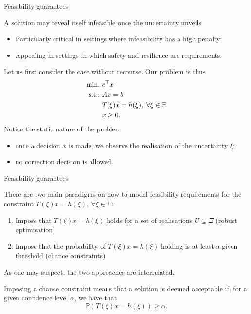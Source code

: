 \begin{frame}{Feasibility guarantees}

	A solution may \alert{reveal itself infeasible} once the uncertainty unveils
	\vspace{-6pt}
	\begin{itemize}
		\item Particularly critical in settings where \alert{infeasibility} has a high penalty;
		\item Appealing in settings in which \alert{safety and resilience} are requirements.	
	\end{itemize}
	
	\pause
	Let us first consider the case \alert{without} recourse. Our problem is thus
	\begin{align*}
		\mathop{\text{min.} \ } & c^\top x  \\
		\mathop{\text{s.t.:} \ }  & Ax = b \\
			 & T(\xi)x	= h(\xi), \ \forall \xi \in \Xi \\
		     & x \ge 0. 
	\end{align*}
	\pause
	Notice the \alert{static} nature of the problem 
	\vspace{-6pt}
	\begin{itemize}
		\item once a decision $x$ is made, we observe the realisation of the uncertainty $\xi$;
		\item no correction decision is allowed.
	\end{itemize} 
	
\end{frame}


\begin{frame}{Feasibility guarantees}
	
	There are two main paradigms on how to model feasibility requirements for the constraint $T(\xi)x	= h(\xi), \ \forall \xi \in \Xi$:
	\begin{enumerate}
		\item Impose that $T(\xi)x	= h(\xi)$ holds for \alert{a set of realisations} $U \subseteq \Xi$ (robust optimisation)
		\item Impose that the \alert{probability} of $T(\xi)x	= h(\xi)$ holding is at least a given threshold (chance constraints)
	\end{enumerate}
	As one may suspect, the two approaches are \alert{interrelated}. 
	
	\pause
	Imposing a chance constraint means that a solution is deemed \alert{acceptable} if, for a given confidence level $\alpha$, we have that
	\begin{equation*}
		\mathbb{P}(T(\xi)x = h(\xi)) \ge \alpha.
	\end{equation*} 
		
\end{frame}


